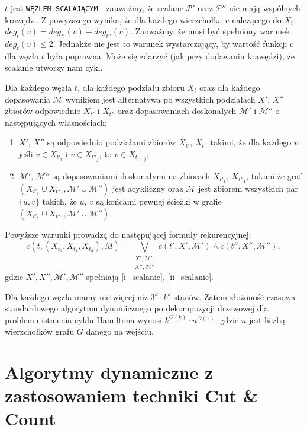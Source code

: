 \documentclass[12pt, oneside]{report}
\newcommand\Omicron{O}
\begin{document}
\newline\newline
$t$ jest \texttt{WĘZŁEM SCALAJĄCYM} - zauważmy, że scalane $\mathcal{P}'$ oraz $\mathcal{P}''$ nie mają wspólnych krawędzi. Z powyższego wynika, że dla każdego wierzchołka $v$ należącego do $X_t$: $deg_t(v) = deg_{t'}(v) + deg_{t''}(v)$. Zauważmy, że musi być spełniony warunek $deg_t(v) \leq 2$.  Jednakże nie jest to warunek wystarczający, by wartość funkcji $c$ dla węzła $t$ była poprawna. Może się zdarzyć (jak przy dodawaniu krawędzi), że scalanie utworzy nam cykl.

Dla każdego węzła $t$, dla każdego podziału zbioru $X_t$ oraz dla każdego dopasowania $\mathcal{M}$ wynikiem jest alternatywa po wszystkich podziałach $X'$, $X''$ zbiorów odpowiednio $X_{t'}$ i $X_{t''}$ oraz dopasowaniach doskonałych $\mathcal{M}'$ i $\mathcal{M}''$ o następujących własnościach:
\begin{enumerate}[label=(\roman*)]
\item \label{i_scalanie}$X'$, $X''$ są odpowiednio podziałami zbiorów $X_{t'}$, $X_{t''}$ takimi, że dla każdego $v$: jeśli $v \in X_{t'_i}$ i $v \in X_{t''_j}$, to $v \in X_{t_{i+j}}$.
\item \label{ii_scalanie}$\mathcal{M}'$, $\mathcal{M}''$ są dopasowaniami doskonałymi na zbiorach $X_{t'_1}$, $X_{t''_1}$, takimi że graf $(X_{t'_1} \cup X_{t''_1}, \mathcal{M}' \cup \mathcal{M}'')$ jest acykliczny oraz $\mathcal{M}$ jest zbiorem wszystkich par $\{u,v\}$ takich, że $u$, $v$ są końcami pewnej ścieżki w grafie $(X_{t'_1} \cup X_{t''_1}, \mathcal{M}' \cup \mathcal{M}'')$.
\end{enumerate}
Powyższe warunki prowadzą do następującej formuły rekurencyjnej:
$$c(t, (X_{t_0}, X_{t_1}, X_{t_2}), M) = \bigvee \limits_{\substack{X', \mathcal{M}'\\X'',\mathcal{M}''}} c(t', X', \mathcal{M}') \wedge c(t'', X'', \mathcal{M}''),$$ gdzie $X', X'', \mathcal{M}', \mathcal{M}''$ spełniają \ref{i_scalanie}, \ref{ii_scalanie}.

Dla każdego węzła mamy nie więcej niż $3^k \cdot k^k$ stanów. Zatem złożoność czasowa standardowego algorytmu dynamicznego po dekompozycji drzewowej dla problemu istnienia cyklu Hamiltona wynosi $k^{\Omicron(k)} \cdot n^{\Omicron{(1)}}$, gdzie $n$ jest liczbą wierzchołków grafu $G$ danego na wejściu. 

\newpage
  	\chapter{Algorytmy dynamiczne z zastosowaniem techniki Cut \& Count}
  	\label{cut_n_count}
\end{document}
